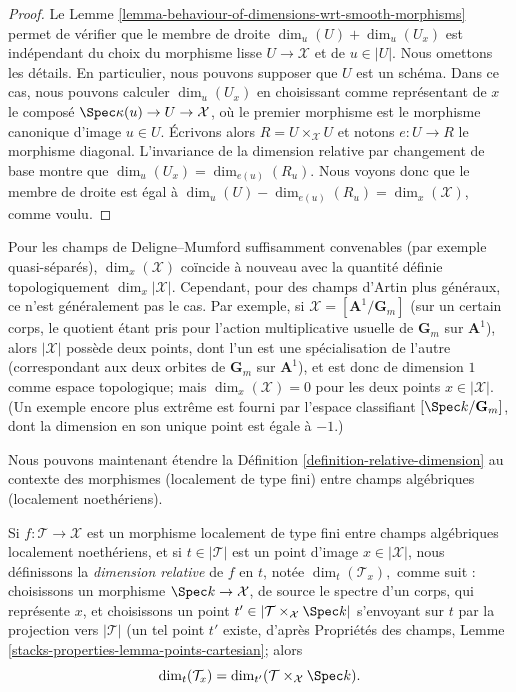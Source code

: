 \begin{proof}
Le Lemme \ref{lemma-behaviour-of-dimensions-wrt-smooth-morphisms}
permet de vérifier que le membre de droite
$\dim_u(U) + \dim_u(U_x)$ est indépendant du choix
du morphisme lisse $U \to \mathcal{X}$ et de $u \in |U|$.
Nous omettons les détails. En particulier, nous pouvons supposer que $U$ est un schéma.
Dans ce cas, nous pouvons calculer $\dim_u(U_x)$
en choisissant comme représentant de $x$
le composé $\Spec \kappa(u) \to U \to \mathcal{X}$, où
le premier morphisme est le morphisme canonique d'image $u \in U$.
Écrivons alors $R = U \times_{\mathcal{X}} U$ et notons
$e : U \to R$ le morphisme diagonal. L'invariance de la
dimension relative par changement de base montre que
$\dim_u(U_x) = \dim_{e(u)}(R_u)$. Nous voyons donc que
le membre de droite est égal à
$\dim_u (U) - \dim_{e(u)}(R_u) = \dim_x(\mathcal{X})$, comme voulu.
\end{proof}

\begin{remark}
\label{remark-dimension-DM}
Pour les champs de Deligne--Mumford suffisamment convenables
(par exemple quasi-séparés),
$\dim_x(\mathcal{X})$ coïncide à nouveau avec la
quantité définie
topologiquement $\dim_x |\mathcal{X}|$. Cependant, pour des champs d'Artin plus
généraux,
ce n'est généralement pas le cas. Par exemple, si
$\mathcal{X} = [\mathbf{A}^1/\mathbf{G}_m]$
(sur un certain corps, le quotient étant pris pour
l'action multiplicative usuelle de $\mathbf{G}_m$ sur $\mathbf{A}^1$),
alors $|\mathcal{X}|$ possède deux points, dont l'un est une spécialisation de l'autre
(correspondant
aux deux orbites de $\mathbf{G}_m$ sur $\mathbf{A}^1$), et est donc de
dimension $1$ comme
espace topologique; mais $\dim_x (\mathcal{X}) = 0$ pour les deux points
$x \in |\mathcal{X}|$.
(Un exemple encore plus extrême est fourni par l'espace classifiant
$[\Spec k/\mathbf{G}_m]$, dont la dimension en son unique point
est égale à $-1$.)
\end{remark}

\noindent
Nous pouvons maintenant étendre la Définition \ref{definition-relative-dimension}
au contexte des morphismes (localement de type fini)
entre champs algébriques (localement noethériens).

\begin{definition}
\label{definition-relative-dimension-for-stacks}
Si $f : \mathcal{T} \to \mathcal{X}$
est un morphisme localement de type fini entre
champs algébriques localement noethériens, et si
$t \in |\mathcal{T}|$ est un point d'image $x \in |\mathcal{X}|$, nous
définissons la {\it dimension relative} de $f$ en $t$, notée
$\dim_t(\mathcal{T}_x),$ comme suit :
choisissons un morphisme $\Spec k \to \mathcal{X}$, de source le spectre d'un
corps, qui représente $x$, et choisissons un point
$t' \in |\mathcal{T} \times_{\mathcal{X}} \Spec k|$
s'envoyant sur $t$ par la projection vers $|\mathcal{T}|$
(un tel point $t'$ existe, d'après
Propriétés des champs, Lemme
\ref{stacks-properties-lemma-points-cartesian}; alors
$$
\dim_t(\mathcal{T}_x) = \dim_{t'}(\mathcal{T} \times_{\mathcal{X}} \Spec k ).
$$
\end{definition}

